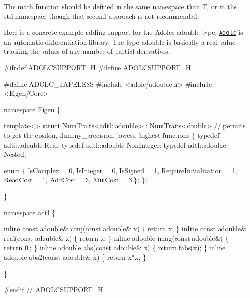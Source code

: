 The math function should be defined in the same namespace than {\ttfamily T}, or in the {\ttfamily std} namespace though that second approach is not recommended.

Here is a concrete example adding support for the Adolc\textquotesingle{}s {\ttfamily adouble} type. \href{https://projects.coin-or.org/ADOL-C}{\tt Adolc} is an automatic differentiation library. The type {\ttfamily adouble} is basically a real value tracking the values of any number of partial derivatives.


\begin{DoxyCode}
\textcolor{preprocessor}{#ifndef ADOLCSUPPORT\_H}
\textcolor{preprocessor}{#define ADOLCSUPPORT\_H}

\textcolor{preprocessor}{#define ADOLC\_TAPELESS}
\textcolor{preprocessor}{#include <adolc/adouble.h>}
\textcolor{preprocessor}{#include <Eigen/Core>}

\textcolor{keyword}{namespace }\hyperlink{namespace_eigen}{Eigen} \{

\textcolor{keyword}{template}<> \textcolor{keyword}{struct }NumTraits<adtl::adouble>
 : NumTraits<double> \textcolor{comment}{// permits to get the epsilon, dummy\_precision, lowest, highest functions}
\{
  \textcolor{keyword}{typedef} adtl::adouble Real;
  \textcolor{keyword}{typedef} adtl::adouble NonInteger;
  \textcolor{keyword}{typedef} adtl::adouble Nested;

  \textcolor{keyword}{enum} \{
    IsComplex = 0,
    IsInteger = 0,
    IsSigned = 1,
    RequireInitialization = 1,
    ReadCost = 1,
    AddCost = 3,
    MulCost = 3
  \};
\};

\}

\textcolor{keyword}{namespace }adtl \{

\textcolor{keyword}{inline} \textcolor{keyword}{const} adouble& conj(\textcolor{keyword}{const} adouble& x)  \{ \textcolor{keywordflow}{return} x; \}
\textcolor{keyword}{inline} \textcolor{keyword}{const} adouble& real(\textcolor{keyword}{const} adouble& x)  \{ \textcolor{keywordflow}{return} x; \}
\textcolor{keyword}{inline} adouble imag(\textcolor{keyword}{const} adouble&)    \{ \textcolor{keywordflow}{return} 0.; \}
\textcolor{keyword}{inline} adouble abs(\textcolor{keyword}{const} adouble&  x)  \{ \textcolor{keywordflow}{return} fabs(x); \}
\textcolor{keyword}{inline} adouble abs2(\textcolor{keyword}{const} adouble& x)  \{ \textcolor{keywordflow}{return} x*x; \}

\}

\textcolor{preprocessor}{#endif // ADOLCSUPPORT\_H}
\end{DoxyCode}


